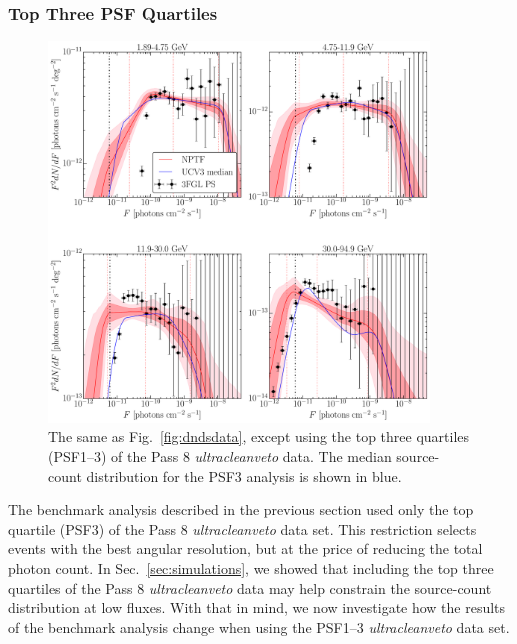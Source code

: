 \subsubsection{Top Three PSF Quartiles}
\label{sec:benchmark_top3}
\begin{figure}[!htbp] %
   \centering
   \includegraphics[width=0.9\textwidth]{ch-igrb/plots/U3RRBlw1p8-1-SourceCounts-final-700-E15-p8-3br.pdf} 
   \caption{The same as Fig.~\ref{fig:dndsdata}, except using the top three quartiles (PSF1--3) of the Pass 8 {\it ultracleanveto} data.  The median source-count distribution for the PSF3 analysis is shown in blue.  %
   }
   \label{fig:dndsdata_top3}
\end{figure}

The benchmark analysis described in the previous section used only the top quartile (PSF3) of the Pass 8 {\it ultracleanveto} data set.  This restriction selects events with the best angular resolution, but at the price of reducing the total photon count.  In Sec.~\ref{sec:simulations}, we showed that  including the top three quartiles of the Pass 8 {\it ultracleanveto} data may help constrain the source-count distribution at low fluxes.  With that in mind, we now investigate how the results of the benchmark analysis change when using the PSF1--3 {\it ultracleanveto} data set.

